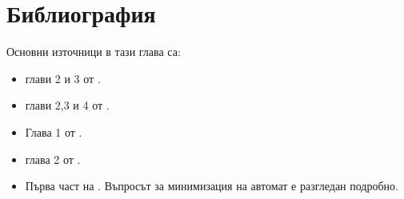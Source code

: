 \section*{Библиография}

Основни източници в тази глава са:
\begin{itemize}
\item 
  глави 2 и 3 от \cite{hopcroft1}.
\item
  глави 2,3 и 4 от \cite{hopcroft2}.
\item
  Глава 1 от \cite{sipser1}.
\item
  глава 2 от \cite{papadimitriou}.
\item
  Първа част на \cite{kozen}. Въпросът за минимизация на автомат е разгледан подробно.
\end{itemize}




